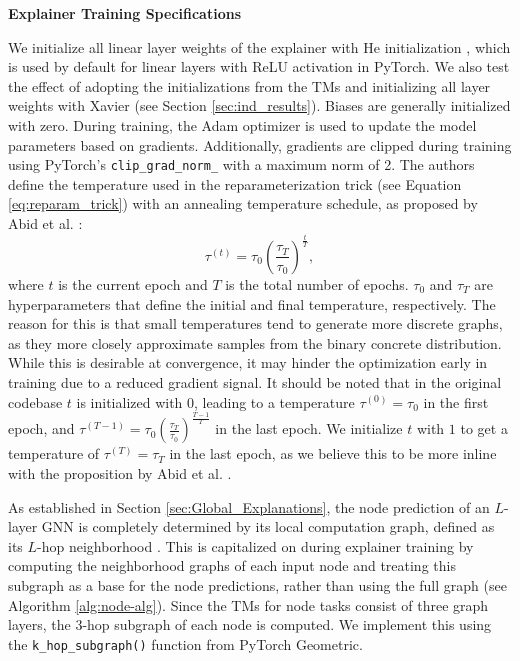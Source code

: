\textbf{Explainer Training Specifications}\par
We initialize all linear layer weights of the explainer with He initialization \cite{he2015delving}, which is used by default for linear layers with ReLU activation in PyTorch. We also test the effect of adopting the initializations from the \acp{TM} and initializing all layer weights with Xavier \cite{glorot2010understanding} (see Section \ref{sec:ind_results}). Biases are generally initialized with zero. During training, the Adam \cite{kingma2014adam} optimizer is used to update the model parameters based on gradients. Additionally, gradients are clipped during training using PyTorch's \lstinline|clip_grad_norm_| with a maximum norm of 2. The authors define the temperature used in the reparameterization trick (see Equation \ref{eq:reparam_trick}) with an annealing temperature schedule, as proposed by Abid et al. \cite{abid2019concrete}:
\begin{equation}
    \tau^{(t)} = \tau_0(\frac{\tau_T}{\tau_0})^{\frac{t}{T}},
\end{equation} 
where $t$ is the current epoch and $T$ is the total number of epochs. $\tau_0$ and $\tau_T$ are hyperparameters that define the initial and final temperature, respectively.
The reason for this is that small temperatures tend to generate more discrete graphs, as they more closely approximate samples from the binary concrete distribution. While this is desirable at convergence, it may hinder the optimization early in training due to a reduced gradient signal. It should be noted that in the original codebase $t$ is initialized with $0$, leading to a temperature $\tau^{(0)} = \tau_0$ in the first epoch, and $\tau^{(T-1)} = \tau_0(\frac{\tau_T}{\tau_0})^{\frac{T-1}{T}}$ in the last epoch. We initialize $t$ with $1$ to get a temperature of $\tau^{(T)} = \tau_T$ in the last epoch, as we believe this to be more inline with the proposition by Abid et al. \cite{abid2019concrete}. \bigskip

As established in Section \ref{sec:Global_Explanations}, the node prediction of an $L$-layer GNN is completely determined by its local computation graph, defined as its $L$-hop neighborhood \cite{ying2019gnnexplainer}. This is capitalized on during explainer training by computing the neighborhood graphs of each input node and treating this subgraph as a base for the node predictions, rather than using the full graph (see Algorithm \ref{alg:node-alg}). Since the \acp{TM} for node tasks consist of three graph layers, the $3$-hop subgraph of each node is computed. We implement this using the \lstinline|k_hop_subgraph()| function from PyTorch Geometric. \bigskip

